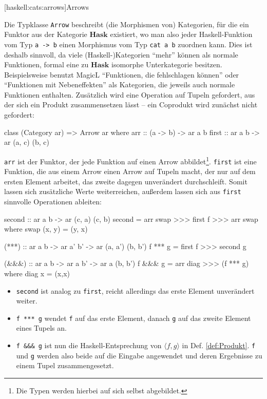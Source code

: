 \documentclass[12pt, a4paper, bibgerm]{scrbook}
\newenvironment{DIFnomarkup}{}{}
\newcommand\icode[1]{\lstinline?#1?}
\newcommand\lsubsection{}
\newcommand{\dref}[1]{Def. \ref{def:#1}}
\begin{document}
\lsubsection[haskell:cats:arrows]{Arrows}

Die Typklasse \icode{Arrow} beschreibt (die Morphismen von) Kategorien,
für die ein Funktor aus der Kategorie $\mathbf{Hask}$ existiert, wo man
also jeder Haskell-Funktion vom Typ \icode{a -> b} einen Morphismus vom
Typ \icode{cat a b} zuordnen kann. Dies ist deshalb sinnvoll, da viele
(Haskell-)Kategorien "`mehr"' können als normale Funktionen, formal eine zu
$\mathbf{Hask}$ isomorphe Unterkategorie besitzen. Beispielsweise
benutzt MagicL "`Funktionen, die fehlschlagen können"' oder "`Funktionen
mit Nebeneffekten"' als Kategorien, die jeweils auch normale Funktionen
enthalten. Zusätzlich wird eine Operation auf Tupeln gefordert, aus der
sich ein Produkt zusammensetzen lässt -- ein Coprodukt wird zunächst nicht gefordert:
\begin{DIFnomarkup}\begin{code}
class (Category ar) => Arrow ar where
  arr   :: (a -> b) -> ar a b
  first :: ar a b  -> ar (a, c) (b, c)
\end{code}\end{DIFnomarkup}
\icode{arr} ist der Funktor, der jede Funktion auf einen Arrow
abbildet\footnote{Die Typen werden hierbei auf sich selbst abgebildet.}.
\icode{first} ist eine Funktion, die aus einem Arrow einen Arrow auf
Tupeln macht, der nur auf dem ersten Element arbeitet, das zweite
dagegen unverändert durchschleift. Somit lassen sich zusätzliche Werte
weiterreichen, außerdem lassen sich aus \icode{first} sinnvolle
Operationen ableiten:

\begin{DIFnomarkup}\begin{code}
  second :: ar a b -> ar (c, a) (c, b)
  second = arr swap >>> first f >>> arr swap
    where swap (x, y) = (y, x)

  (***) :: ar a b -> ar a' b' -> ar (a, a') (b, b')
  f *** g = first f >>> second g

  (&&&) :: ar a b -> ar a b' -> ar a (b, b')
  f &&& g = arr diag >>> (f *** g)
    where diag x = (x,x)
\end{code}\end{DIFnomarkup} %

\begin{itemize}
\item \icode{second} ist analog zu \icode{first}, reicht allerdings das erste
Element unverändert weiter.
\item \icode{f *** g} wendet \icode{f} auf das
erste Element, danach \icode{g} auf das zweite Element eines Tupels
an.
\item \icode{f &&& g} ist nun die Haskell-Entsprechung von $\langle f,g
\rangle$ in \dref{Produkt}. \icode{f} und \icode{g} werden also beide
auf die Eingabe angewendet und deren Ergebnisse zu einem Tupel
zusammengesetzt.
\end{itemize}
\end{document}

